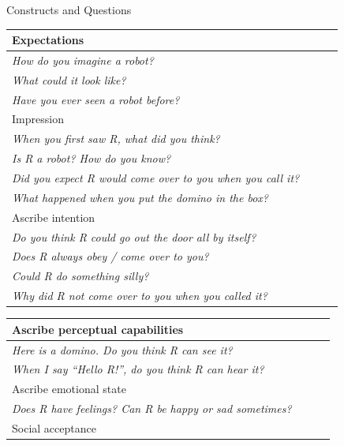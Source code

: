 \documentclass[compress]{beamer}
\renewcommand{\bf}{\Medium}
\begin{document}
\begin{frame}{Constructs and Questions}
\scriptsize
    \begin{multicols}{2}
    \begin{table}[]
        \begin{tabularx}{\linewidth}{p{0.9\linewidth}}

    \toprule
    {\bf Expectations} \tabularnewline
    \midrule
    \emph{How do you imagine a robot?} \tabularnewline
    \emph{What could it look like?} \tabularnewline
    \emph{Have you ever seen a robot before?} \tabularnewline

    \toprule
    {\bf Impression} \tabularnewline
    \midrule


    \emph{When you first saw R, what did you think?} \tabularnewline
    \emph{Is R a robot? How do you know?} \tabularnewline
    \emph{Did you expect R would come over to you when you call it?} \tabularnewline
    \emph{What happened when you put the domino in the box?} \tabularnewline

    \toprule
    {\bf Ascribe intention} \tabularnewline
    \midrule


    \emph{Do you think R could go out the door all by itself?} \tabularnewline	
    \emph{Does R always obey / come over to you?} \tabularnewline
    \emph{Could R do something silly?} \tabularnewline
    \emph{Why did R not come over to you when you called it?} \tabularnewline

            \bottomrule
        \end{tabularx}
        \label{tab:options}
    \end{table}

    \begin{table}[]
        \begin{tabularx}{\linewidth}{p{0.9\linewidth}}


    \toprule
    {\bf Ascribe perceptual capabilities} \tabularnewline
    \midrule


    \emph{Here is a domino. Do you think R can see it?} \tabularnewline 
    \emph{When I say \textit{``Hello R!''}, do you think R can hear it?} \tabularnewline

    \toprule
    {\bf Ascribe emotional state} \tabularnewline
    \midrule


    \emph{Does R have feelings? Can R be happy or sad sometimes?}
    \tabularnewline

    \toprule
    {\bf Social acceptance} \tabularnewline
    \midrule



\end{tabularx}
\end{table}
\end{multicols}
\end{frame}
\end{document}
